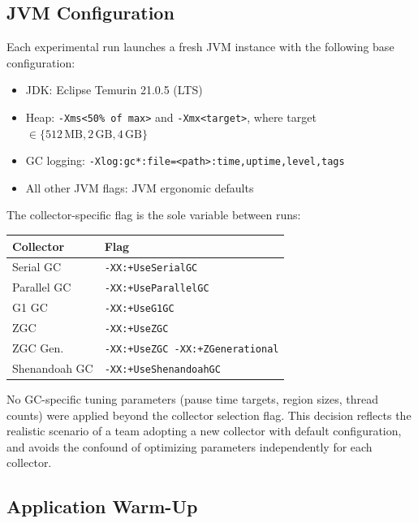 \subsection{JVM Configuration}
\label{subsec:jvm-config}

Each experimental run launches a fresh JVM instance with the following base configuration:

\begin{itemize}
    \item JDK: Eclipse Temurin 21.0.5 (LTS)
    \item Heap: \texttt{-Xms<50\% of max>} and \texttt{-Xmx<target>}, where target $\in \{512\,\text{MB}, 2\,\text{GB}, 4\,\text{GB}\}$
    \item GC logging: \texttt{-Xlog:gc*:file=<path>:time,uptime,level,tags}
    \item All other JVM flags: JVM ergonomic defaults
\end{itemize}

The collector-specific flag is the sole variable between runs:

\begin{center}
\begin{tabular}{ll}
\toprule
\textbf{Collector} & \textbf{Flag} \\
\midrule
Serial GC      & \texttt{-XX:+UseSerialGC} \\
Parallel GC    & \texttt{-XX:+UseParallelGC} \\
G1 GC          & \texttt{-XX:+UseG1GC} \\
ZGC            & \texttt{-XX:+UseZGC} \\
ZGC Gen.       & \texttt{-XX:+UseZGC -XX:+ZGenerational} \\
Shenandoah GC  & \texttt{-XX:+UseShenandoahGC} \\
\bottomrule
\end{tabular}
\end{center}

No GC-specific tuning parameters (pause time targets, region sizes, thread counts) were applied beyond the collector selection flag. This decision reflects the realistic scenario of a team adopting a new collector with default configuration, and avoids the confound of optimizing parameters independently for each collector.

\subsection{Application Warm-Up}
\label{subsec:warmup}

